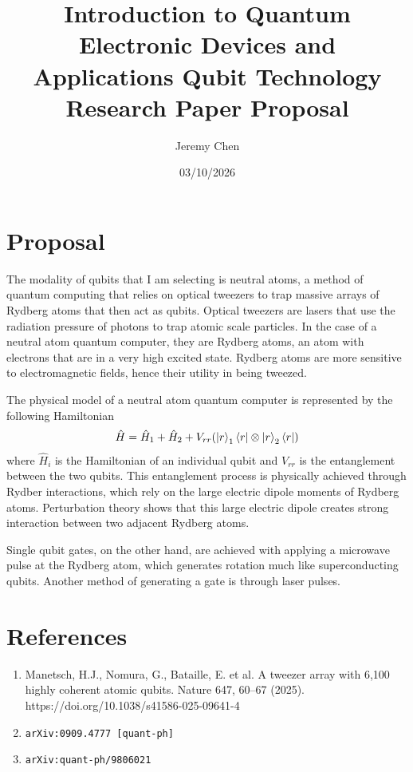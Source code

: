 \documentclass[10pt,letterpaper]{article}
\title{Introduction to Quantum Electronic Devices and Applications Qubit Technology Research Paper Proposal}
\author{Jeremy Chen}
\date{03/10/2026}
\begin{document}
	\maketitle

\section*{Proposal}
The modality of qubits that I am selecting is neutral atoms, a method of quantum computing that relies on optical tweezers to trap massive arrays of Rydberg atoms that then act as qubits. Optical tweezers are lasers that use the radiation pressure of photons to trap atomic scale particles. In the case of a neutral atom quantum computer, they are Rydberg atoms, an atom with electrons that are in a very high excited state. Rydberg atoms are more sensitive to electromagnetic fields, hence their utility in being tweezed. 

The physical model of a neutral atom quantum computer is represented by the following Hamiltonian
$$\hat{H} = \hat{H}_{1} + \hat{H}_{2} + V_{rr}(\ket{r}_{1}\bra{r} \otimes \ket{r}_{2}\bra{r})$$
where $\hat{H}_{i}$ is the Hamiltonian of an individual qubit and $V_{rr}$ is the entanglement between the two qubits. This entanglement process is physically achieved through Rydber interactions, which rely on the large electric dipole moments of Rydberg atoms. Perturbation theory shows that this large electric dipole creates strong interaction between two adjacent Rydberg atoms. 

Single qubit gates, on the other hand, are achieved with applying a microwave pulse at the Rydberg atom, which generates rotation much like superconducting qubits. Another method of generating a gate is through laser pulses. 

\section*{References}
\begin{enumerate}[1. ]
	
\item Manetsch, H.J., Nomura, G., Bataille, E. et al. A tweezer array with 6,100 highly coherent atomic qubits. Nature 647, 60–67 (2025). https://doi.org/10.1038/s41586-025-09641-4

\item { \tt arXiv:0909.4777 [quant-ph] }

\item { \tt arXiv:quant-ph/9806021 }

\end{enumerate}
\end{document}

